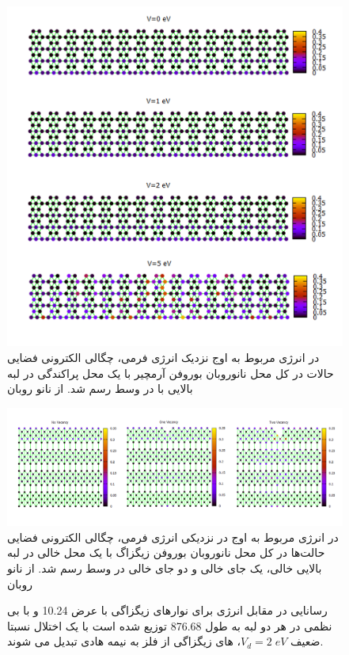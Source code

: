 \begin{figure}[!ht]
  \centering
  \includegraphics[width=1\linewidth]{./figures/Slide3.PNG}
  \caption{در انرژی مربوط به اوج  نزدیک انرژی فرمی، چگالی الکترونی فضایی حالات در کل محل نانوروبان بوروفن آرمچیر با یک محل پراکندگی در لبه بالایی با  در وسط رسم شد. از نانو روبان}
  \label{armCSLDOS}
\end{figure}
\begin{figure}[!ht]
    \centering
    \includegraphics[width=1\linewidth]{./figures/Slide4.PNG}
    \caption{در انرژی مربوط به اوج  در نزدیکی انرژی فرمی، چگالی الکترونی فضایی حالت‌ها در کل محل نانوروبان بوروفن زیگزاگ با یک محل خالی در لبه بالایی خالی، یک جای خالی و دو جای خالی در وسط رسم شد. از نانو روبان}
    \label{zigVSLDOS}
\end{figure}
\begin{figure}[!ht]
\centering

\caption{رسانایی در مقابل انرژی برای نوارهای زیگزاگی با عرض \lr{\AA} 10.24 و با بی نظمی در هر دو لبه به طول \lr{\AA} 876.68 توزیع شده است
با یک اختلال نسبتا ضعیف $V_d=2\;eV$،  های زیگزاگی از فلز به نیمه هادی تبدیل می شوند.}
\label{zigzagdisorder}
\end{figure}
